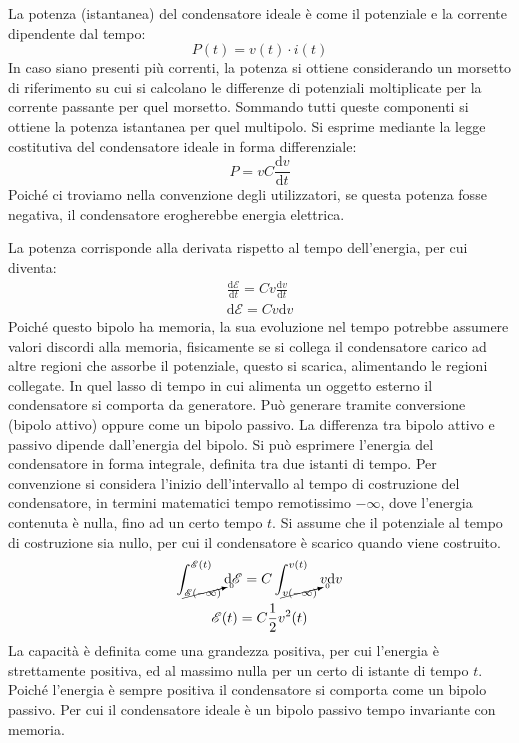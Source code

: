 \documentclass{article}
\newcommand{\df}{\mathrm{d}}
\numberwithin{equation}{subsection}
\begin{document}
La potenza (istantanea) del condensatore ideale è come il potenziale e la corrente dipendente dal tempo:
\begin{equation*}
    P(t)=v(t)\cdot i(t)
\end{equation*}
In caso siano presenti più correnti, la potenza si ottiene considerando un morsetto di riferimento su cui si calcolano le differenze di potenziali moltiplicate per la 
corrente passante per quel morsetto. Sommando tutti queste componenti si ottiene la potenza istantanea per quel multipolo. 
Si esprime mediante la legge costitutiva del condensatore ideale in forma differenziale:
\begin{equation*}
    P=vC\displaystyle\frac{\df v}{\df t}
\end{equation*}
Poiché ci troviamo nella convenzione degli utilizzatori, se questa potenza fosse negativa, il condensatore erogherebbe energia elettrica. 

La potenza corrisponde alla derivata rispetto al tempo dell'energia, per cui diventa:
\begin{gather*}
    \displaystyle\frac{\df\mathscr{E}}{\df t}=Cv\frac{\df v}{\df t}\\
    \df\mathscr{E}=Cv\df v
\end{gather*}
Poiché questo bipolo ha memoria, la sua evoluzione nel tempo potrebbe assumere valori discordi alla memoria, fisicamente se si collega il condensatore carico ad altre regioni 
che assorbe il potenziale, questo si scarica, alimentando le regioni collegate. In quel lasso di tempo in cui alimenta un oggetto esterno il condensatore si comporta da 
generatore. Può generare tramite conversione (bipolo attivo) oppure come un bipolo passivo. La differenza tra bipolo attivo e passivo dipende dall'energia del bipolo. 
Si può esprimere l'energia del condensatore in forma integrale, definita tra due istanti di tempo. Per convenzione si considera l'inizio dell'intervallo al tempo di 
costruzione del condensatore, in termini matematici tempo remotissimo $-\infty$, dove l'energia contenuta è nulla, fino ad un certo tempo $t$. Si assume che il potenziale 
al tempo di costruzione sia nullo, per cui il condensatore è scarico quando viene costruito. 
\begin{gather*}
    \displaystyle\int_{\cancelto{0}{\mathscr{E}(-\infty)}}^{\mathscr{E}(t)}\df\mathscr{E}=C\int_{\cancelto{0}{v(-\infty)}}^{v(t)}v\df v\\
    \mathscr{E}(t)=C\displaystyle\frac{1}{2}v^2(t)
\end{gather*}
La capacità è definita come una grandezza positiva, per cui l'energia è strettamente positiva, ed al massimo nulla per un certo di istante di tempo $t$. Poiché l'energia 
è sempre positiva il condensatore si comporta come un bipolo passivo. Per cui il condensatore ideale è un bipolo passivo tempo invariante con memoria. 
\end{document}
